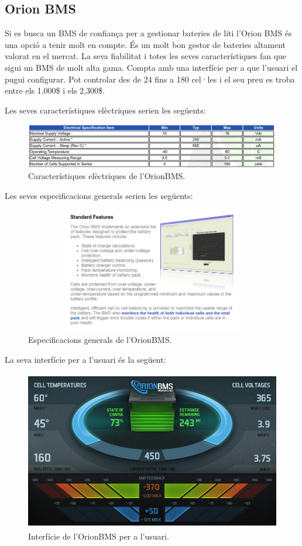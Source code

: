 \subsection{Orion BMS}
Si es busca un BMS de confiança per a gestionar bateries de liti l'Orion BMS és una opció a tenir molt en compte. És un molt bon gestor de bateries altament valorat en el mercat. La seva fiabilitat i totes les seves característiques fan que sigui un BMS de molt alta gama. Compta amb una interfície per a que l'usuari el pugui configurar. Pot controlar des de 24 fins a 180 cel·les i el seu preu es troba entre els 1,000\$ i els 2,300\$.

Les seves característiques elèctriques serien les següents:

\begin{figure}[H]
		\centering
    	\includegraphics[width=\textwidth]{Marcteoric/electricalspecsorionbms.png}
     	\caption{Característiques elèctriques de l'OrionBMS.}
\end{figure}

Les seves especificacions generals serien les següents:

\begin{figure}[H]
		\centering
    	\includegraphics[width=12cm,height=5.5cm]{Marcteoric/stdftsorionbms.png}
     	\caption{Especificacions generals de l'OrionBMS.}
\end{figure}

La seva interfície per a l'usuari és la següent:

\begin{figure}[H]
		\centering
    	\includegraphics[width=\textwidth,height=7cm]{Marcteoric/orionbmsinterface.jpg}
     	\caption{Interfície de l'OrionBMS per a l'usuari.}
\end{figure}

